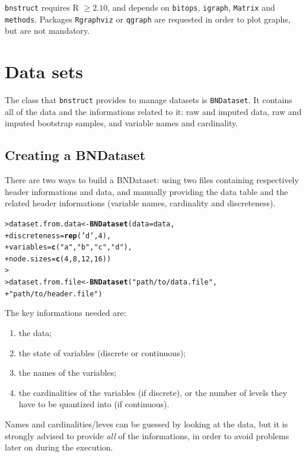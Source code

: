 \documentclass{article}\usepackage[]{graphicx}\usepackage[]{color}
\makeatletter
\newcommand{\hlnum}[1]{\textcolor[rgb]{0.686,0.059,0.569}{#1}}%
\newcommand{\hlstr}[1]{\textcolor[rgb]{0.192,0.494,0.8}{#1}}%
\newcommand{\hlstd}[1]{\textcolor[rgb]{0.345,0.345,0.345}{#1}}%
\newcommand{\hlkwb}[1]{\textcolor[rgb]{0.69,0.353,0.396}{#1}}%
\newcommand{\hlkwc}[1]{\textcolor[rgb]{0.333,0.667,0.333}{#1}}%
\newcommand{\hlkwd}[1]{\textcolor[rgb]{0.737,0.353,0.396}{\textbf{#1}}}%
\newenvironment{kframe}{%
 \def\at@end@of@kframe{}%
 \ifinner\ifhmode%
  \def\at@end@of@kframe{\end{minipage}}%
  \begin{minipage}{\columnwidth}%
 \fi\fi%
 \def\FrameCommand##1{\hskip\@totalleftmargin \hskip-\fboxsep
 \colorbox{shadecolor}{##1}\hskip-\fboxsep
     \hskip-\linewidth \hskip-\@totalleftmargin \hskip\columnwidth}%
 \MakeFramed {\advance\hsize-\width
   \@totalleftmargin\z@ \linewidth\hsize
   \@setminipage}}%
 {\par\unskip\endMakeFramed%
 \at@end@of@kframe}
\newenvironment{knitrout}{}{} %
\newcommand{\Robject}[1]{{\texttt{#1}}}
\newcommand{\Rpackage}[1]{{\texttt{#1}}}
\makeatother
\begin{document}
\Rpackage{bnstruct} requires R $\geq 2.10$,
and depends on \Rpackage{bitops}, \Rpackage{igraph}, \Rpackage{Matrix} and \Rpackage{methods}.
Packages \Rpackage{Rgraphviz} or \Rpackage{qgraph} are requested in order to plot graphs,
but are not mandatory.


\section{Data sets}
The class that \Rpackage{bnstruct} provides to manage datasets is \Robject{BNDataset}.
It contains all of the data and the informations related to it: raw and imputed data, raw and imputed
bootstrap samples, and variable names and cardinality.

\subsection{Creating a BNDataset}
There are two ways to build a BNDataset: using two files containing respectively header informations
and data, and manually providing the data table and the related header informations
(variable names, cardinality and discreteness).

\begin{knitrout}
\color{fgcolor}\begin{kframe}
\begin{alltt}
\hlstd{> }\hlstd{dataset.from.data} \hlkwb{<-} \hlkwd{BNDataset}\hlstd{(}\hlkwc{data} \hlstd{= data,}
\hlstd{+ }                               \hlkwc{discreteness} \hlstd{=} \hlkwd{rep}\hlstd{(}\hlstr{'d'}\hlstd{,}\hlnum{4}\hlstd{),}
\hlstd{+ }                               \hlkwc{variables} \hlstd{=} \hlkwd{c}\hlstd{(}\hlstr{"a"}\hlstd{,} \hlstr{"b"}\hlstd{,} \hlstr{"c"}\hlstd{,} \hlstr{"d"}\hlstd{),}
\hlstd{+ }                               \hlkwc{node.sizes} \hlstd{=} \hlkwd{c}\hlstd{(}\hlnum{4}\hlstd{,}\hlnum{8}\hlstd{,}\hlnum{12}\hlstd{,}\hlnum{16}\hlstd{))}
\hlstd{> }
\hlstd{> }\hlstd{dataset.from.file} \hlkwb{<-} \hlkwd{BNDataset}\hlstd{(}\hlstr{"path/to/data.file"}\hlstd{,}
\hlstd{+ }                               \hlstr{"path/to/header.file"}\hlstd{)}
\end{alltt}
\end{kframe}
\end{knitrout}

The key informations needed are:
\begin{enumerate}
\item the data;
\item the state of variables (discrete or continuous);
\item the names of the variables;
\item the cardinalities of the variables (if discrete), or the number of levels they have to be quantized into
(if continuous). 
\end{enumerate}
Names and cardinalities/leves can be guessed by looking at the data, but it is strongly advised to provide
\textit{all} of the informations, in order to avoid problems later on during the execution.
\end{document}
